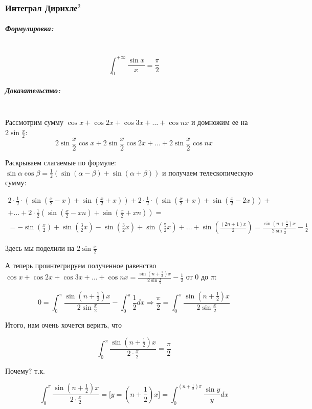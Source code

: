 \documentclass{article}
\let\vanillasubparagraph\subparagraph
\renewcommand{\subparagraph}[1]{\vanillasubparagraph{#1}\mbox{}\\}
\begin{document}
\subsubsection{Интеграл Дирихле\texorpdfstring{$^2$}{}}

\subparagraph{Формулировка: }
$$
\int_0^{+\infty} \frac{\sin{x}}{x} = \frac{\pi}{2}
$$
\subparagraph{Доказательство: }

Рассмотрим сумму $\cos{x} + \cos{2x} + \cos{3x} + \ldots + \cos{nx}$ и домножим ее на $2\sin{\frac{x}{2}}$: 
$$
2\sin{\frac{x}{2}}\cos{x} + 2\sin{\frac{x}{2}}\cos{2x} + \ldots + 2\sin{\frac{x}{2}}\cos{nx}
$$

Раскрываем слагаемые по формуле: $\sin{\alpha}\cos{\beta} = \frac{1}{2}\left(\sin{(\alpha - \beta)} + \sin{(\alpha + \beta)}\right)$ и получаем телескопическую сумму:

\begin{multline*}
2 \cdot \frac{1}{2} \cdot (\sin{\left(\frac{x}{2} - x\right)} + \sin{\left(\frac{x}{2} + x\right)}) + 2 \cdot \frac{1}{2} \cdot (\sin{\left(\frac{x}{2} + x\right)} + \sin{(\frac{x}{2} - 2x)})+ \\
+ \ldots + 2 \cdot \frac{1}{2} (\sin{\left(\frac{x}{2} - xn\right)} + \sin{\left(\frac{x}{2} + xn\right)})=\\
= -\sin{\left(\frac{x}{2}\right)} + \sin{\left(\frac{3}{2} x\right)} - \sin{\left(\frac{3}{2} x\right)} + \sin{\left(\frac{5}{2} x\right)} + \ldots + \sin{\left(\frac{(2n + 1)x}{2}\right)} = \frac{\sin{(n + \frac{1}{2})x}}{2\sin{\frac{x}{2}}} - \frac{1}{2}
\end{multline*}

Здесь мы поделили на $2 \sin{\frac{x}{2}}$

А теперь проинтегрируем полученное равенство $\cos{x} + \cos{2x} + \cos{3x} + \ldots + \cos{nx} = \frac{\sin{(n + \frac{1}{2})x}}{2\sin{\frac{x}{2}}} - \frac{1}{2}$ от $0$ до $\pi$: 

$$
0 = \int_0^\pi \frac{\sin{\left(n + \frac{1}{2}\right)}x}{2\sin{\frac{x}{2}}} - \int_0^\pi \frac{1}{2}dx \Rightarrow \frac{\pi}{2} = \int_0^\pi \frac{\sin{\left(n + \frac{1}{2}\right)}x}{2\sin{\frac{x}{2}}}
$$

Итого, нам очень хочется верить, что 

$$
\int_0^\pi \frac{\sin{\left(n+\frac{1}{2}\right)}x}{2 \cdot \frac{x}{2}} = \frac{\pi}{2}
$$

Почему? т.к.

$$
\int_0^\pi \frac{\sin{\left(n+\frac{1}{2}\right)}x}{2 \cdot \frac{x}{2}} = \big[y = (n + \frac{1}{2})x\big] = \int_0^{(n + \frac{1}{2})\pi} \frac{\sin y}{y} dx
$$
\end{document}
